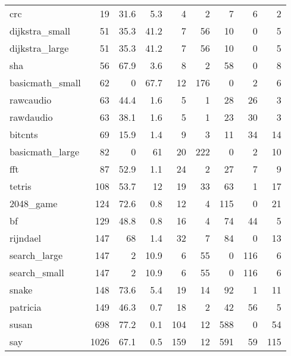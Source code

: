 \begin{tabular}{lrrrrrrrr}
 crc             &       19 &     31.6 &    5.3 &    4 &    2 &      7 &     6 &     2 \\
 dijkstra\_small  &       51 &     35.3 &   41.2 &    7 &   56 &     10 &     0 &     5 \\
 dijkstra\_large  &       51 &     35.3 &   41.2 &    7 &   56 &     10 &     0 &     5 \\
 sha             &       56 &     67.9 &    3.6 &    8 &    2 &     58 &     0 &     8 \\
 basicmath\_small &       62 &      0   &   67.7 &   12 &  176 &      0 &     2 &     6 \\
 rawcaudio       &       63 &     44.4 &    1.6 &    5 &    1 &     28 &    26 &     3 \\
 rawdaudio       &       63 &     38.1 &    1.6 &    5 &    1 &     23 &    30 &     3 \\
 bitcnts         &       69 &     15.9 &    1.4 &    9 &    3 &     11 &    34 &    14 \\
 basicmath\_large &       82 &      0   &   61   &   20 &  222 &      0 &     2 &    10 \\
 fft             &       87 &     52.9 &    1.1 &   24 &    2 &     27 &     7 &     9 \\
 tetris          &      108 &     53.7 &   12   &   19 &   33 &     63 &     1 &    17 \\
 2048\_game       &      124 &     72.6 &    0.8 &   12 &    4 &    115 &     0 &    21 \\
 bf              &      129 &     48.8 &    0.8 &   16 &    4 &     74 &    44 &     5 \\
 rijndael        &      147 &     68   &    1.4 &   32 &    7 &     84 &     0 &    13 \\
 search\_large    &      147 &      2   &   10.9 &    6 &   55 &      0 &   116 &     6 \\
 search\_small    &      147 &      2   &   10.9 &    6 &   55 &      0 &   116 &     6 \\
 snake           &      148 &     73.6 &    5.4 &   19 &   14 &     92 &     1 &    11 \\
 patricia        &      149 &     46.3 &    0.7 &   18 &    2 &     42 &    56 &     5 \\
 susan           &      698 &     77.2 &    0.1 &  104 &   12 &    588 &     0 &    54 \\
 say             &     1026 &     67.1 &    0.5 &  159 &   12 &    591 &    59 &   115 \\

\end{tabular}
